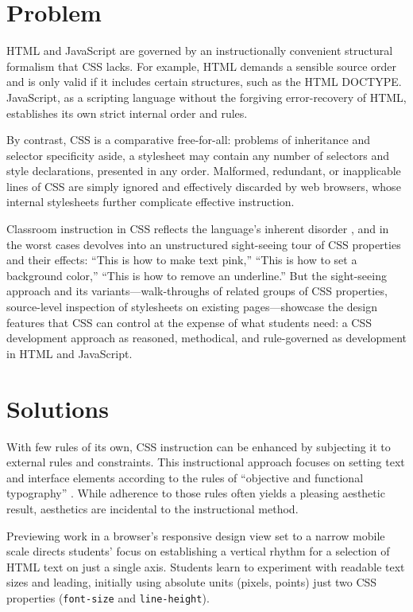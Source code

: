 \documentclass[sigconf]{acmart}
\begin{document}
\section{Problem}
HTML and JavaScript are governed by an instructionally convenient structural formalism that CSS lacks. For example, HTML demands a sensible source order and is only valid if it includes certain structures, such as the HTML DOCTYPE. JavaScript, as a scripting language without the forgiving error-recovery of HTML, establishes its own strict internal order and rules.

By contrast, CSS is a comparative free-for-all: problems of inheritance and selector specificity aside, a stylesheet may contain any number of selectors and style declarations, presented in any order. Malformed, redundant, or inapplicable lines of CSS are simply ignored and effectively discarded by web browsers, whose internal stylesheets further complicate effective instruction.

Classroom instruction in CSS reflects the language's inherent disorder \cite{pw:learning}, and in the worst cases devolves into an unstructured sight-seeing tour of CSS properties and their effects: “This is how to make text pink,” “This is how to set a background color,” “This is how to remove an underline.” But the sight-seeing approach and its variants—walk-throughs of related groups of CSS properties, source-level inspection of stylesheets on existing pages—showcase the design features that CSS can control at the expense of what students need: a CSS development approach as reasoned, methodical, and rule-governed as development in HTML and JavaScript.

\section{Solutions}

With few rules of its own, CSS instruction can be enhanced by subjecting it to external rules and constraints. This instructional approach focuses on setting text and interface elements according to the rules of “objective and functional typography” \cite{mb:grid}. While adherence to those rules often yields a pleasing aesthetic result, aesthetics are incidental to the instructional method.

Previewing work in a browser's responsive design view set to a narrow mobile scale directs students' focus on establishing a vertical rhythm for a selection of HTML text on just a single axis. Students learn to experiment with readable text sizes and leading, initially using absolute units (pixels, points) just two CSS properties (\verb|font-size| and \verb|line-height|).
\end{document}
